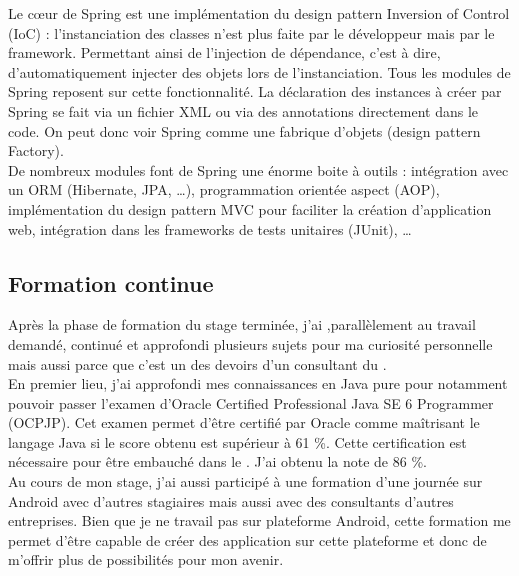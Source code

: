 Le c\oe{}ur de Spring est une implémentation du design pattern Inversion of Control (IoC) : l'instanciation des classes n'est plus faite par le développeur mais par le framework. Permettant ainsi de l'injection de dépendance, c'est à dire, d'automatiquement injecter des objets lors de l'instanciation. Tous les modules de Spring reposent sur cette fonctionnalité. La déclaration des instances à créer par Spring se fait via un fichier XML ou via des annotations directement dans le code. On peut donc voir Spring comme une fabrique d'objets (design pattern Factory).\\

De nombreux modules font de Spring une énorme boite à outils : intégration avec un ORM (Hibernate, JPA, \dots), programmation orientée aspect (AOP), implémentation du design pattern MVC pour faciliter la création d'application web, intégration dans les frameworks de tests unitaires (JUnit), \dots

\subsection{Formation continue}

Après la phase de formation du stage terminée, j'ai ,parallèlement au travail demandé, continué et approfondi plusieurs sujets pour ma curiosité personnelle mais aussi parce que c'est un des devoirs d'un consultant du \excilysGroup{}.\\

En premier lieu, j'ai approfondi mes connaissances en Java pure pour notamment pouvoir passer l'examen d'Oracle Certified Professional Java SE 6 Programmer (OCPJP). Cet examen permet d'être certifié par Oracle comme \flqq{}maîtrisant le langage Java\frqq{} si le score obtenu est supérieur à 61 \%. Cette certification est nécessaire pour être embauché dans le \excilysGroup{}. J'ai obtenu la note de 86 \%.\\

Au cours de mon stage, j'ai aussi participé à une formation d'une journée sur Android \cite{parlezvousandroid} avec d'autres stagiaires mais aussi avec des consultants d'autres entreprises. Bien que je ne travail pas sur plateforme Android, cette formation me permet d'être capable de créer des application sur cette plateforme et donc de m'offrir plus de possibilités pour mon avenir.